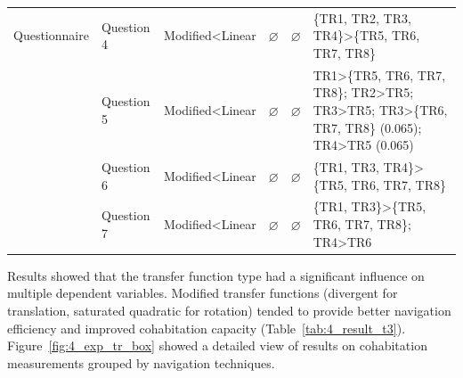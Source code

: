 \begin{table}
\begin{tabular}{p{2cm} | p{3cm} l l l p{6cm}}
   \cline{2-6}
  Questionnaire & Question 4 & Modified\textless Linear & $\varnothing$ & $\varnothing$ & \{TR1, TR2, TR3, TR4\}\textgreater \{TR5, TR6, TR7, TR8\} \\
  \cline{2-6}
   & Question 5 & Modified\textless Linear & $\varnothing$ & $\varnothing$ & TR1\textgreater \{TR5, TR6, TR7, TR8\}; TR2\textgreater TR5; TR3\textgreater TR5; TR3\textgreater \{TR6, TR7, TR8\} (0.065); TR4\textgreater TR5 (0.065) \\ \cline{2-6}
   & Question 6 & Modified\textless Linear & $\varnothing$ & $\varnothing$ & \{TR1, TR3, TR4\}\textgreater \{TR5, TR6, TR7, TR8\} \\ \cline{2-6}
   & Question 7 & Modified\textless Linear & $\varnothing$ & $\varnothing$ & \{TR1, TR3\}\textgreater \{TR5, TR6, TR7, TR8\}; TR4\textgreater TR6 \\
  \hline
\end{tabular}
\end{table}

Results showed that the transfer function type had a significant influence on multiple dependent variables. Modified transfer functions (divergent for translation, saturated quadratic for rotation) tended to provide better navigation efficiency and improved cohabitation capacity (Table~\ref{tab:4_result_t3}). Figure~\ref{fig:4_exp_tr_box} showed a detailed view of results on cohabitation measurements grouped by navigation techniques.

